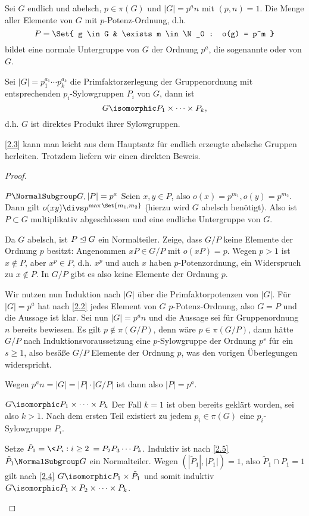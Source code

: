 \begin{st} \label{2.3}
	Sei $G$ endlich und abelsch, $p \in \pi(G)$ und $|G| = p^a n$ mit $(p, n) = 1$.
	Die Menge aller Elemente von $G$ mit $p$-Potenz-Ordnung, d.h.
	\[
		P = \Set{ g \in G & \exists m \in \N_0 : o(g) = p^m }
	\]
	bildet eine normale Untergruppe von $G$ der Ordnung $p^a$, die sogenannte  oder  von $G$.

	Sei $|G| = p_1^{a_1} \dotsb p_k^{a_k}$ die Primfaktorzerlegung der Gruppenordnung mit entsprechenden $p_i$-Sylowgruppen $P_i$ von $G$, dann ist
	\[
		G \isomorphic P_1 \times \dotsb \times P_k,
	\]
	d.h. $G$ ist direktes Produkt ihrer Sylowgruppen.
	\begin{note}
		\ref{2.3} kann man leicht aus dem Hauptsatz für endlich erzeugte abelsche Gruppen herleiten.
		Trotzdem liefern wir einen direkten Beweis.
	\end{note}
	\begin{proof}
		\begin{seg}{$P \NormalSubgroup G, |P| = p^a$}
			Seien $x, y \in P$, also $o(x) = p^{m_1}, o(y) = p^{m_2}$.
			Dann gilt $o(xy) \divs p^{\max\Set{m_1, m_2}}$ (hierzu wird $G$ abelsch benötigt).
			Also ist $P \subset G$ multiplikativ abgeschlossen und eine endliche Untergruppe von $G$.

			Da $G$ abelsch, ist $P \trianglelefteq G$ ein Normalteiler.
			Zeige, dass $G / P$ keine Elemente der Ordnung $p$ besitzt:
			Angenommen $xP \in G / P$ mit $o(xP) = p$.
			Wegen $p > 1$ ist $x \not\in P$, aber $x^p \in P$, d.h. $x^p$ und auch $x$ haben $p$-Potenzordnung, ein Widerspruch zu $x \not\in P$.
			In $G / P$ gibt es also keine Elemente der Ordnung $p$.

			Wir nutzen nun Induktion nach $|G|$ über die Primfaktorpotenzen von $|G|$.
			Für $|G| = p^a$ hat nach \ref{2.2} jedes Element von $G$ $p$-Potenz-Ordnung, also $G = P$ und die Aussage ist klar.
			Sei nun $|G| = p^a n$ und die Aussage sei für Gruppenordnung $n$ bereits bewiesen.
			Es gilt $p \not\in \pi(G/P)$, denn wäre $p \in \pi(G/P)$, dann hätte $G/P$ nach Induktionsvoraussetzung eine $p$-Sylowgruppe der Ordnung $p^s$ für ein $s \ge 1$, also besäße $G / P$ Elemente der Ordnung $p$, was den vorigen Überlegungen widerspricht.

			Wegen $p^a n = |G| = |P| \cdot |G / P|$ ist dann also $|P| = p^a$.
		\end{seg}
		\begin{seg}{$G \isomorphic P_1 \times \dotsb \times P_k$}
			Der Fall $k = 1$ ist oben bereits geklärt worden, sei also $k > 1$.
			Nach dem ersten Teil existiert zu jedem $p_i \in \pi(G)$ eine $p_i$-Sylowgruppe $P_i$.

			Setze $\tilde P_1 = \< P_i : i \ge 2 \> = P_2 P_3 \dotsb P_k$.
			Induktiv ist nach \ref{2.5} $\tilde P_1 \NormalSubgroup G$ ein Normalteiler.
			Wegen $(|\tilde P_1|, |P_1|) = 1$, also $\tilde P_1 \cap P_1 = 1$ gilt nach \ref{2.4} $G \isomorphic P_1 \times \tilde P_1$ und somit induktiv $G \isomorphic P_1 \times P_2 \times \dotsb \times P_k$.
		\end{seg}
	\end{proof}
\end{st}

